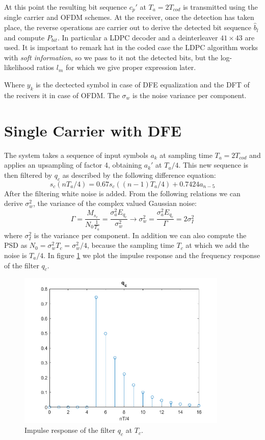 \documentclass[a4paper,11.5pt]{article}
\begin{document}
At this point the resulting bit sequence $c_p'$ at $T_a = 2T_{cod}$ is transmitted using the single carrier and OFDM schemes. At the receiver, once the detection has taken place, the reverse operations are carrier out to derive the detected bit sequence $\hat{b}_l$ and compute $P_{bit}$. In particular a LDPC decoder and a deinterleaver $41\times 43$ are used. It is important to remark hat in the coded case the LDPC algorithm works with \emph{soft information}, so we pass to it not the detected bits, but the log-likelihood ratios $l_m$ for which we give proper expression later.

Where $y_k$ is the dectected symbol in case of DFE equalization and the DFT of the recivers it in case of OFDM. The $\sigma_w$ is the noise variance per component.

\section*{Single Carrier with DFE}

The system takes a sequence of input symbols $a_k$ at sampling time $T_a=2T_{cod}$ and applies an upsampling of factor 4, obtaining $a_k'$ at $T_a/4$. This new sequence is then filtered by $q_c$ as described by the following difference equation:
\begin{equation}\label{eq:q_c}
s_c(nT_a/4) = 0.67 s_c((n-1)T_a/4) + 0.7424 a_{n-5}
\end{equation}
After the filtering white noise is added. From the following relations we can derive $\sigma_w^2$, the variance of the complex valued Gaussian noise:
\begin{equation}
\Gamma = \frac{M_{s_c}}{N_0\frac{1}{T_a}} = \frac{\sigma_a^2 E_{q_c}}{\sigma_w^2} \longrightarrow \sigma_w^2 = \frac{\sigma_a^2 E_{q_c}}{\Gamma} = 2\sigma_I^2
\end{equation}
where $\sigma_I^2$ is the variance per component. In addition we can also compute the PSD as $N_0=\sigma_w^2 T_c=\sigma_w^2/4$, because the sampling time $T_c$ at which we add the noise is $T_a/4$.
In figure \ref{fig:qc} we plot the impulse response and the frequency response of the filter $q_c$.

\begin{figure}[H]
	\begin{center}   
		\includegraphics[width=10cm]{figs/q_c.png}  
		\caption{Impulse response of the filter $q_c$ at $T_c$.}
		\label{fig:qc}
	\end{center}
\end{figure} 
\end{document}
